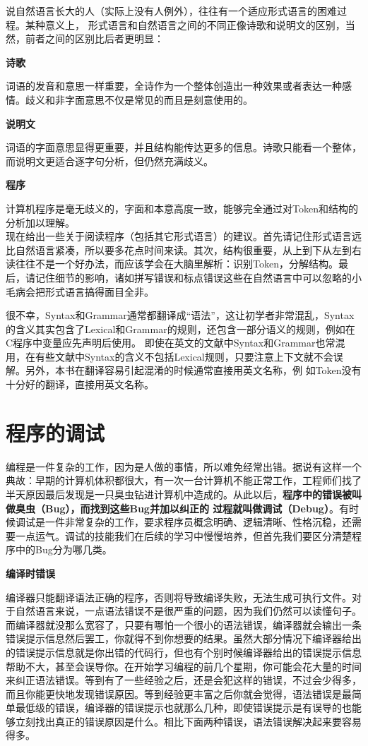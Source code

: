 \documentclass[12pt]{book}
\begin{document}
说自然语言长大的人（实际上没有人例外），往往有一个适应形式语言的困难过程。某种意义上，
形式语言和自然语言之间的不同正像诗歌和说明文的区别，当然，前者之间的区别比后者更明显：

\textbf{诗歌}

词语的发音和意思一样重要，全诗作为一个整体创造出一种效果或者表达一种感情。歧义和非字面意思不仅是常见的而且是刻意使用的。

\textbf{说明文}

词语的字面意思显得更重要，并且结构能传达更多的信息。诗歌只能看一个整体，而说明文更适合逐字句分析，但仍然充满歧义。

\textbf{程序}

计算机程序是毫无歧义的，字面和本意高度一致，能够完全通过对Token和结构的分析加以理解。
\\
现在给出一些关于阅读程序（包括其它形式语言）的建议。首先请记住形式语言远比自然语言紧凑，所以要多花点时间来读。其次，结构很重要，从上到下从左到右读往往不是一个好办法，而应该学会在大脑里解析：识别Token，分解结构。最后，请记住细节的影响，诸如拼写错误和标点错误这些在自然语言中可以忽略的小毛病会把形式语言搞得面目全非。

很不幸，Syntax和Grammar通常都翻译成``语法''，这让初学者非常混乱，Syntax的含义其实包含了Lexical和Grammar的规则，还包含一部分语义的规则，例如在C程序中变量应先声明后使用。
即使在英文的文献中Syntax和Grammar也常混用，在有些文献中Syntax的含义不包括Lexical规则，只要注意上下文就不会误解。另外，本书在翻译容易引起混淆的时候通常直接用英文名称，例
如Token没有十分好的翻译，直接用英文名称。


\section{程序的调试}

编程是一件复杂的工作，因为是人做的事情，所以难免经常出错。据说有这样一个典故：早期的计算机体积都很大，有一次一台计算机不能正常工作，工程师们找了半天原因最后发现是一只臭虫钻进计算机中造成的。从此以后，\textbf{程序中的错误被叫做臭虫（Bug），而找到这些Bug并加以纠正的
过程就叫做调试（Debug）}。有时候调试是一件非常复杂的工作，要求程序员概念明确、逻辑清晰、性格沉稳，还需要一点运气。调试的技能我们在后续的学习中慢慢培养，但首先我们要区分清楚程序中的Bug分为哪几类。

\textbf{编译时错误}

编译器只能翻译语法正确的程序，否则将导致编译失败，无法生成可执行文件。对于自然语言来说，一点语法错误不是很严重的问题，因为我们仍然可以读懂句子。而编译器就没那么宽容了，只要有哪怕一个很小的语法错误，编译器就会输出一条错误提示信息然后罢工，你就得不到你想要的结果。虽然大部分情况下编译器给出的错误提示信息就是你出错的代码行，但也有个别时候编译器给出的错误提示信息帮助不大，甚至会误导你。在开始学习编程的前几个星期，你可能会花大量的时间来纠正语法错误。等到有了一些经验之后，还是会犯这样的错误，不过会少得多，而且你能更快地发现错误原因。等到经验更丰富之后你就会觉得，语法错误是最简单最低级的错误，编译器的错误提示也就那么几种，即使错误提示是有误导的也能够立刻找出真正的错误原因是什么。相比下面两种错误，语法错误解决起来要容易得多。
\end{document}
